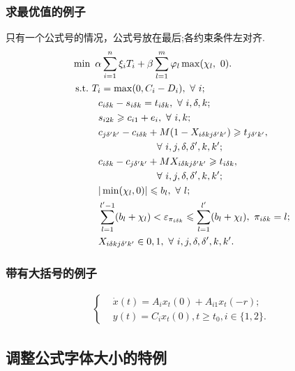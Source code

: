 \documentclass{ctacn}%
\begin{document}
\begin{multicols}{2}
\subsubsection{求最优值的例子}
只有一个公式号的情况，公式号放在最后;各约束条件左对齐.
\begin{align}
&\min~\alpha\sum\limits_{i=1}^n\xi_{i}T_{i}+\beta \sum\limits_{l=1}^m \varphi_{l} \max(\chi_{l},~0).\notag\\
&{\rm{~s.t.~}}T_{i}=\max(0,C_i-D_i),~\forall~i;\notag\\
&~~~~~~~~c_{i \delta k}-s_{i \delta k}=t_{i \delta k},~\forall~i,\delta,k;\notag\\
&~~~~~~~~s_{i 2 k}\geqslant c_{i 1 }+e_i,~\forall~i,k;\notag\\
&~~~~~~~~c_{j \delta' k'}-c_{i \delta k}+M(1-X_{i \delta k j\delta'k'})\geqslant t_{j \delta' k'},\notag\\
&~~~~~~~~~~~~~~~~~~~~~~~~~~\forall~i,j,\delta,\delta',k,k';\notag\\
&~~~~~~~~c_{i \delta k}-c_{j \delta' k'}+M X_{i \delta k j\delta'k'}\geqslant t_{i \delta k},\notag\\
&~~~~~~~~~~~~~~~~~~~~~~~~~~\forall~i,j,\delta,\delta',k,k';\notag\\
&~~~~~~~~|\min(\chi_{l},0)|\leqslant b_l,~\forall~ l;\notag\\
&~~~~~~~~\sum\limits_{l=1}^{l'-1} (b_{l}+\chi_{l})< \varepsilon_{\pi_{i \delta k}}\leqslant  \sum\limits_{l=1}^{l'} (b_{l}+\chi_{l}),~\pi_{i \delta k}=l;\notag\\
&~~~~~~~~X_{i \delta k j\delta'k'} \in {0,1},~\forall~ i,j,\delta,\delta',k,k'.
\end{align}


\subsubsection{带有大括号的例子}\vspace{-15pt}
\begin{align}
\left\{\begin{aligned}
&\dot{x}(t)=A_{i}x_{t}(0)+A_{i1}x_{t}(-r);\\
&y(t)=C_{i}x_{t}(0),t\geqslant t_{0}, i\in\{1, 2\}.
\end{aligned}\right.
\end{align}


\subsection{调整公式字体大小的特例}


\end{multicols}
\end{document}
